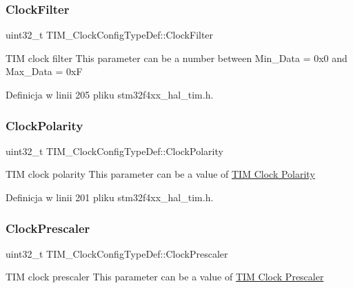 \subsubsection{\texorpdfstring{Clock\+Filter}{ClockFilter}}
{\footnotesize\ttfamily uint32\+\_\+t T\+I\+M\+\_\+\+Clock\+Config\+Type\+Def\+::\+Clock\+Filter}

T\+IM clock filter This parameter can be a number between Min\+\_\+\+Data = 0x0 and Max\+\_\+\+Data = 0xF 

Definicja w linii 205 pliku stm32f4xx\+\_\+hal\+\_\+tim.\+h.

\mbox{\label{struct_t_i_m___clock_config_type_def_a66453fa8dc8a300267ff5aba08eff5c4}} 
\subsubsection{\texorpdfstring{Clock\+Polarity}{ClockPolarity}}
{\footnotesize\ttfamily uint32\+\_\+t T\+I\+M\+\_\+\+Clock\+Config\+Type\+Def\+::\+Clock\+Polarity}

T\+IM clock polarity This parameter can be a value of \hyperlink{group___t_i_m___clock___polarity}{T\+IM Clock Polarity} 

Definicja w linii 201 pliku stm32f4xx\+\_\+hal\+\_\+tim.\+h.

\mbox{\label{struct_t_i_m___clock_config_type_def_ae4c0cb6f58da0ec7b99f1c6411d2fee1}} 
\subsubsection{\texorpdfstring{Clock\+Prescaler}{ClockPrescaler}}
{\footnotesize\ttfamily uint32\+\_\+t T\+I\+M\+\_\+\+Clock\+Config\+Type\+Def\+::\+Clock\+Prescaler}

T\+IM clock prescaler This parameter can be a value of \hyperlink{group___t_i_m___clock___prescaler}{T\+IM Clock Prescaler} 

